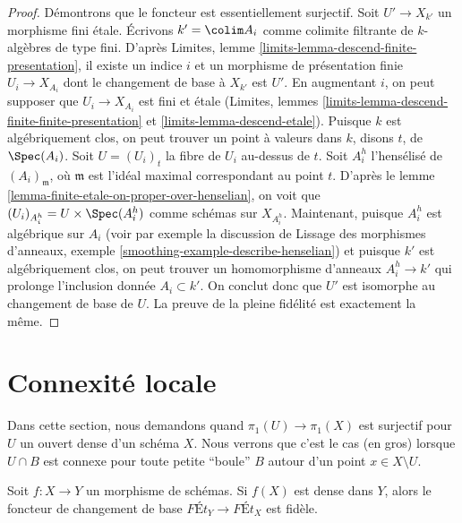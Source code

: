 \begin{proof}
Démontrons que le foncteur est essentiellement surjectif.
Soit $U' \to X_{k'}$ un morphisme fini étale.
Écrivons $k' = \colim A_i$ comme colimite filtrante de $k$-algèbres de type fini.
D'après Limites, lemme \ref{limits-lemma-descend-finite-presentation},
il existe un indice $i$ et un morphisme de présentation finie $U_i \to X_{A_i}$
dont le changement de base à $X_{k'}$ est $U'$. En augmentant $i$,
on peut supposer que $U_i \to X_{A_i}$ est fini et étale
(Limites, lemmes \ref{limits-lemma-descend-finite-finite-presentation} et
\ref{limits-lemma-descend-etale}).
Puisque $k$ est algébriquement clos, on peut trouver un
point à valeurs dans $k$, disons $t$, de $\Spec(A_i)$. Soit $U = (U_i)_t$ la
fibre de $U_i$ au-dessus de $t$. Soit $A_i^h$
l'hensélisé de $(A_i)_{\mathfrak m}$, où $\mathfrak m$ est
l'idéal maximal correspondant au point $t$. D'après
le lemme \ref{lemma-finite-etale-on-proper-over-henselian},
on voit que $(U_i)_{A_i^h} = U \times \Spec(A_i^h)$ comme schémas
sur $X_{A_i^h}$. Maintenant, puisque
$A_i^h$ est algébrique sur $A_i$ (voir par exemple la discussion de
Lissage des morphismes d'anneaux, exemple \ref{smoothing-example-describe-henselian})
et puisque $k'$ est algébriquement clos,
on peut trouver un homomorphisme d'anneaux $A_i^h \to k'$ qui prolonge
l'inclusion donnée $A_i \subset k'$. On conclut donc que $U'$
est isomorphe au changement de base de $U$.
La preuve de la pleine fidélité est exactement la même.
\end{proof}








\section{Connexité locale}
\label{section-unibranch}

\noindent
Dans cette section, nous demandons quand $\pi_1(U) \to \pi_1(X)$ est surjectif
pour $U$ un ouvert dense d'un schéma $X$. Nous verrons que c'est
le cas (en gros) lorsque $U \cap B$ est connexe pour toute petite
``boule'' $B$ autour d'un point $x \in X \setminus U$.

\begin{lemma}
\label{lemma-dense-faithful}
Soit $f : X \to Y$ un morphisme de schémas. Si $f(X)$ est dense dans $Y$,
alors le foncteur de changement de base $\textit{F\'Et}_Y \to \textit{F\'Et}_X$
est fidèle.
\end{lemma}

